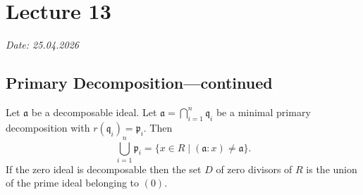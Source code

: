 \chapter{Lecture 13}

\hfill {\footnotesize \emph{Date: 25.04.2026}}
\section{Primary Decomposition---continued}
\begin{proposition}
  Let \( \mathfrak{a} \) be a decomposable ideal. Let \( \mathfrak{a} = \bigcap_{i=1}^n \mathfrak{q}_i \) be a minimal primary decomposition with \( r(\mathfrak{q}_i) = \mathfrak{p}_i \). Then
  \[
    \bigcup_{i=1}^n \mathfrak{p}_i = \{x \in R \mid (\mathfrak{a}: x) \neq \mathfrak{a}\}.
  \]
  If the zero ideal is decomposable then the set \( D \) of zero divisors of  \( R \) is the union of the prime ideal belonging to  \( (0) \).
\end{proposition}

